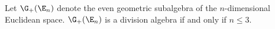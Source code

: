 \begin{theorem}\label{t:nondivisibility}
	Let $\G_+(\E_n)$ denote the even geometric subalgebra of the $n$-dimensional Euclidean space.
	$\G_+(\E_n)$ is a division algebra if and only if $n \leq 3$.
\end{theorem}
